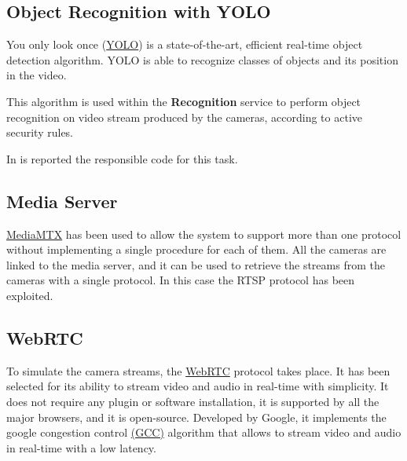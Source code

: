\documentclass{scrartcl}
\begin{document}
    \subsection{Object Recognition with YOLO}
    You only look once (\href{https://pjreddie.com/darknet/yolo}{YOLO}) is a state-of-the-art, efficient real-time object detection algorithm.
    YOLO is able to recognize classes of objects and its position in the video.

    This algorithm is used within the \textbf{Recognition} service to perform object recognition on video stream produced by the cameras, according to active security rules.

    In  is reported the responsible code for this task.
    


    \subsection{Media Server}
    \href{https://github.com/bluenviron/mediamtx}{MediaMTX} has been used to allow the system to support more than one protocol without implementing a single procedure for each of them.
    All the cameras are linked to the media server, and it can be used to retrieve the streams from the cameras with a single protocol.
    In this case the RTSP protocol has been exploited.

    \subsection{WebRTC}
    To simulate the camera streams, the \href{https://webrtc.org/}{WebRTC} protocol takes place.
    It has been selected for its ability to stream video and audio in real-time with simplicity.
    It does not require any plugin or software installation, it is supported by all the major browsers, and it is open-source.
    Developed by Google, it implements the google congestion control \href{https://www.researchgate.net/publication/316684665_Congestion_Control_for_Real-Time_Communication}{(GCC)} algorithm that allows to stream video and audio in real-time with a low latency.
\end{document}
